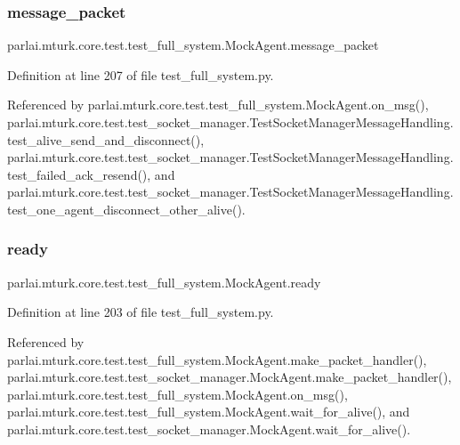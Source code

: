\subsubsection{\texorpdfstring{message\+\_\+packet}{message\_packet}}
{\footnotesize\ttfamily parlai.\+mturk.\+core.\+test.\+test\+\_\+full\+\_\+system.\+Mock\+Agent.\+message\+\_\+packet}



Definition at line 207 of file test\+\_\+full\+\_\+system.\+py.



Referenced by parlai.\+mturk.\+core.\+test.\+test\+\_\+full\+\_\+system.\+Mock\+Agent.\+on\+\_\+msg(), parlai.\+mturk.\+core.\+test.\+test\+\_\+socket\+\_\+manager.\+Test\+Socket\+Manager\+Message\+Handling.\+test\+\_\+alive\+\_\+send\+\_\+and\+\_\+disconnect(), parlai.\+mturk.\+core.\+test.\+test\+\_\+socket\+\_\+manager.\+Test\+Socket\+Manager\+Message\+Handling.\+test\+\_\+failed\+\_\+ack\+\_\+resend(), and parlai.\+mturk.\+core.\+test.\+test\+\_\+socket\+\_\+manager.\+Test\+Socket\+Manager\+Message\+Handling.\+test\+\_\+one\+\_\+agent\+\_\+disconnect\+\_\+other\+\_\+alive().

\mbox{\label{classparlai_1_1mturk_1_1core_1_1test_1_1test__full__system_1_1MockAgent_a57036d23635f6e1e5d040758d26f6058}} 
\subsubsection{\texorpdfstring{ready}{ready}}
{\footnotesize\ttfamily parlai.\+mturk.\+core.\+test.\+test\+\_\+full\+\_\+system.\+Mock\+Agent.\+ready}



Definition at line 203 of file test\+\_\+full\+\_\+system.\+py.



Referenced by parlai.\+mturk.\+core.\+test.\+test\+\_\+full\+\_\+system.\+Mock\+Agent.\+make\+\_\+packet\+\_\+handler(), parlai.\+mturk.\+core.\+test.\+test\+\_\+socket\+\_\+manager.\+Mock\+Agent.\+make\+\_\+packet\+\_\+handler(), parlai.\+mturk.\+core.\+test.\+test\+\_\+full\+\_\+system.\+Mock\+Agent.\+on\+\_\+msg(), parlai.\+mturk.\+core.\+test.\+test\+\_\+full\+\_\+system.\+Mock\+Agent.\+wait\+\_\+for\+\_\+alive(), and parlai.\+mturk.\+core.\+test.\+test\+\_\+socket\+\_\+manager.\+Mock\+Agent.\+wait\+\_\+for\+\_\+alive().

